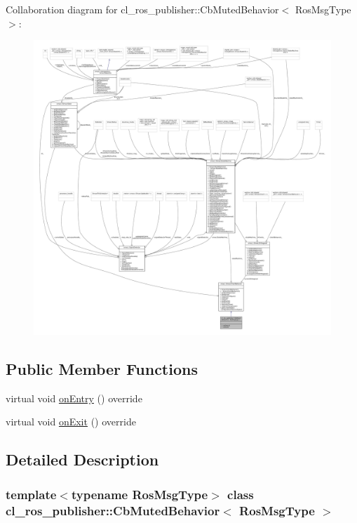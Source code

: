 Collaboration diagram for cl\+\_\+ros\+\_\+publisher\+:\+:Cb\+Muted\+Behavior$<$ Ros\+Msg\+Type $>$\+:
\nopagebreak
\begin{figure}[H]
\begin{center}
\leavevmode
\includegraphics[width=350pt]{classcl__ros__publisher_1_1CbMutedBehavior__coll__graph}
\end{center}
\end{figure}
\subsection*{Public Member Functions}
\begin{DoxyCompactItemize}
\item 
virtual void \hyperlink{classcl__ros__publisher_1_1CbMutedBehavior_a79376d9160e3bd44678a2c0d89f1b4de}{on\+Entry} () override
\item 
virtual void \hyperlink{classcl__ros__publisher_1_1CbMutedBehavior_a4c02187c58358fa811777d9956510222}{on\+Exit} () override
\end{DoxyCompactItemize}


\subsection{Detailed Description}
\subsubsection*{template$<$typename Ros\+Msg\+Type$>$\newline
class cl\+\_\+ros\+\_\+publisher\+::\+Cb\+Muted\+Behavior$<$ Ros\+Msg\+Type $>$}



